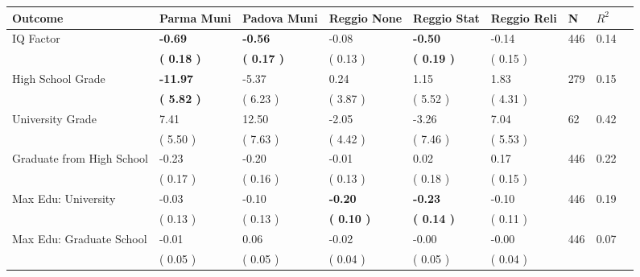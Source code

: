 \begin{tabular}{L{6.2cm} C{1.8cm} C{1.8cm} C{1.8cm} C{1.8cm} C{1.8cm} C{1.8cm} C{0.3cm} C{0.3cm}}
\toprule
 \textbf{Outcome} & \textbf{Parma Muni} & \textbf{Padova Muni} & \textbf{Reggio None} & \textbf{Reggio Stat} & \textbf{Reggio Reli} & \textbf{N} & \textbf{$ R^2$} \\
\midrule
IQ Factor & \textbf{    -0.69} & \textbf{    -0.56} &     -0.08 & \textbf{    -0.50} &     -0.14  & 446 &       0.14 \\ 
 & \textbf{(     0.18 )} & \textbf{(     0.17 )} & (     0.13 ) & \textbf{(     0.19 )} & (     0.15 )  & \\
High School Grade & \textbf{   -11.97} &     -5.37 &      0.24 &      1.15 &      1.83  & 279 &       0.15 \\ 
 & \textbf{(     5.82 )} & (     6.23 ) & (     3.87 ) & (     5.52 ) & (     4.31 )  & \\
University Grade &      7.41 &     12.50 &     -2.05 &     -3.26 &      7.04  & 62 &       0.42 \\ 
 & (     5.50 ) & (     7.63 ) & (     4.42 ) & (     7.46 ) & (     5.53 )  & \\
Graduate from High School &     -0.23 &     -0.20 &     -0.01 &      0.02 &      0.17  & 446 &       0.22 \\ 
 & (     0.17 ) & (     0.16 ) & (     0.13 ) & (     0.18 ) & (     0.15 )  & \\
Max Edu: University &     -0.03 &     -0.10 & \textbf{    -0.20} & \textbf{    -0.23} &     -0.10  & 446 &       0.19 \\ 
 & (     0.13 ) & (     0.13 ) & \textbf{(     0.10 )} & \textbf{(     0.14 )} & (     0.11 )  & \\
Max Edu: Graduate School &     -0.01 &      0.06 &     -0.02 &     -0.00 &     -0.00  & 446 &       0.07 \\ 
 & (     0.05 ) & (     0.05 ) & (     0.04 ) & (     0.05 ) & (     0.04 )  & \\
\bottomrule
\end{tabular}
